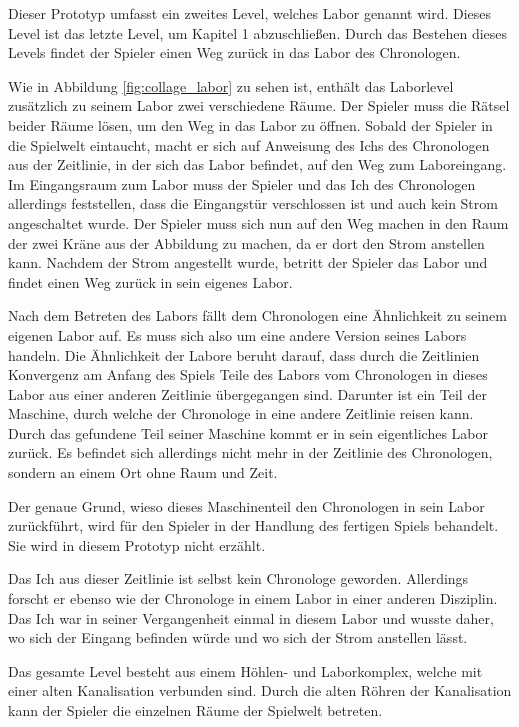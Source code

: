 Dieser Prototyp umfasst ein zweites Level, welches Labor genannt wird. Dieses Level ist das letzte Level, um Kapitel 1 abzuschließen. Durch das Bestehen dieses Levels findet der Spieler einen Weg zurück in das Labor des Chronologen.

Wie in Abbildung \ref{fig:collage_labor}  zu sehen ist, enthält das Laborlevel zusätzlich zu seinem Labor zwei verschiedene Räume. Der Spieler muss die Rätsel beider Räume lösen, um den Weg in das Labor zu öffnen. Sobald der Spieler in die Spielwelt eintaucht, macht er sich auf Anweisung des Ichs des Chronologen aus der Zeitlinie, in der sich das Labor befindet, auf den Weg zum Laboreingang. Im Eingangsraum zum Labor muss der Spieler und das Ich des Chronologen allerdings feststellen, dass die Eingangstür verschlossen ist und auch kein Strom angeschaltet wurde. Der Spieler muss sich nun auf den Weg machen in den Raum der zwei Kräne aus der Abbildung zu machen, da er dort den Strom anstellen kann. Nachdem der Strom angestellt wurde, betritt der Spieler das Labor und findet einen Weg zurück in sein eigenes Labor.

Nach dem Betreten des Labors fällt dem Chronologen eine Ähnlichkeit zu seinem eigenen Labor auf. Es muss sich also um eine andere Version seines Labors handeln. Die Ähnlichkeit der Labore beruht darauf, dass durch die Zeitlinien Konvergenz am Anfang des Spiels Teile des Labors vom Chronologen in dieses Labor aus einer anderen Zeitlinie übergegangen sind. Darunter ist ein Teil der Maschine, durch welche der Chronologe in eine andere Zeitlinie reisen kann. Durch das gefundene Teil seiner Maschine kommt er in  sein eigentliches Labor zurück. Es befindet sich allerdings nicht mehr in der Zeitlinie des Chronologen, sondern an einem Ort ohne Raum und Zeit.

Der genaue Grund, wieso dieses Maschinenteil den Chronologen in sein Labor zurückführt, wird für den Spieler in der Handlung des fertigen Spiels behandelt. Sie wird in diesem Prototyp nicht erzählt.

Das Ich aus dieser Zeitlinie ist selbst kein Chronologe geworden. Allerdings forscht er ebenso wie der Chronologe in einem Labor in einer anderen Disziplin. Das Ich war in seiner Vergangenheit einmal in diesem Labor und wusste daher, wo sich der Eingang befinden würde und wo sich der Strom anstellen lässt.

Das gesamte Level besteht aus einem Höhlen- und Laborkomplex, welche mit einer alten Kanalisation verbunden sind. Durch die alten Röhren der Kanalisation kann der Spieler die einzelnen Räume der Spielwelt betreten.

